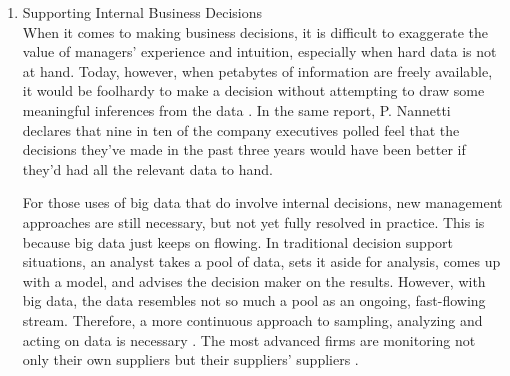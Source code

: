 \documentclass[runningheads]{llncs}
\begin{document}
\begin{enumerate}
\item Supporting Internal Business Decisions\\

When it comes to making business decisions, it is difficult to exaggerate the value of managers' experience and intuition, especially when hard data is not at hand. Today, however, when petabytes of information
are freely available, it would be foolhardy to make a decision without attempting to draw some meaningful inferences from the data \cite{NANNETTI}. In the same report, P. Nannetti declares that nine in ten of the company executives polled feel that the decisions they've made in the past three years would have been better if they'd had all the relevant data to hand. 

For those uses of big data that do involve internal decisions, new management approaches are still necessary, but not yet fully resolved in practice. This is because big data just keeps on flowing. In traditional decision support situations, an analyst takes a pool of data, sets it aside for analysis, comes up with a model, and advises the decision maker on the results. However, with big data, the data resembles not so much a pool as an ongoing, fast-flowing stream. Therefore, a more continuous approach to sampling, analyzing and acting on data is necessary \cite{EMERALD}. The most advanced firms are monitoring not only their own suppliers but their suppliers' suppliers \cite{DAVENPORT}.

\end{enumerate}
\end{document}
